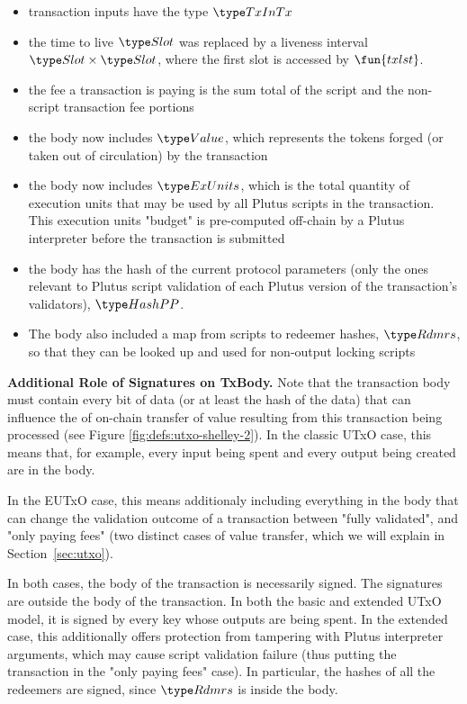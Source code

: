 \begin{itemize}
  \item transaction inputs have the type $\TxInTx$
  \item the
  time to live $\Slot$ was replaced by a liveness interval $\Slot \times \Slot$,
  where the first slot is accessed by $\fun{txlst}$.
  \item the fee a transaction is paying is the sum total of the script and the
  non-script transaction fee portions
  \item the body now includes $\Value$, which represents
  the tokens forged (or taken out of circulation) by the transaction
  \item the body now includes $\ExUnits$, which is the total quantity of execution units
  that may be used by all Plutus scripts in the transaction.
  This execution units "budget" is pre-computed off-chain by a Plutus interpreter
  before the transaction is submitted
  \item the body has the hash of the current protocol parameters
  (only the ones relevant to Plutus script validation of each Plutus
  version of the transaction's validators), $\HashPP$.
  \item The body also included a map from scripts to redeemer hashes, $\Rdmrs$,
  so that they can be looked up and used for non-output locking scripts
\end{itemize}

\textbf{Additional Role of Signatures on TxBody.}
Note that the transaction body must contain every bit of data
(or at least the hash of the data) that can influence the
of on-chain transfer of value resulting from this transaction being processed
(see Figure \ref{fig:defs:utxo-shelley-2}).
In the classic UTxO case, this means that, for example,
every input being spent and every output being created are in the body.

In the EUTxO case, this means additionaly including everything in the body that can change
the validation outcome of a transaction between "fully validated", and "only
paying fees" (two distinct cases of value transfer, which
we will explain in Section~\ref{sec:utxo}).

In both cases, the body of the transaction is necessarily signed. The signatures
are outside the body of the transaction.
In both the basic and extended UTxO model, it is signed by every key
whose outputs are being spent. In the extended case, this additionally offers
protection from tampering with Plutus interpreter arguments, which may cause
script validation failure (thus putting the transaction in the "only paying fees" case).
In particular, the hashes of all the redeemers are signed, since $\Rdmrs$ is inside
  the body.


